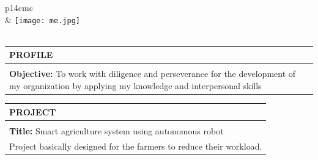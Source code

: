 \documentclass[10pt]{article}
\begin{document}
	
\begin{center}
	\setlength{\arrayrulewidth}{1mm} %
	\begin{tabular}{ p{14cm}c } 
		\hline    %
		 \\
		& 	\texttt{[image: me.jpg]}  \\					
		\hline	
		\hspace{2cm}\\
	\end{tabular}
\end{center}

\begin{table}[h!]   %
	\begin{tabular}{|p{17cm}|}
		\hline
		\rowcolor {cyan!30} \textbf{PROFILE} \\   %
		\hline
		\hline
		\hspace{2cm}\\
        \textbf{Objective:} To work with diligence and perseverance for the development of my organization by applying my knowledge and interpersonal skills\\ [1ex] %
  		\hline
	\end{tabular}
\end{table}

\begin{table}[h]
	\begin{tabular}{|p{17cm}|} 
		\hline
		\rowcolor {cyan!30}	\textbf{PROJECT} \\
		\hline
		\hline
		\hspace{2cm}\\	
		\textbf{Title:} Smart agriculture system using autonomous robot\\   Project basically designed for the farmers to reduce their workload.\\ [1ex]
		\hline		
	\end{tabular}
\end{table}
\end{document}
